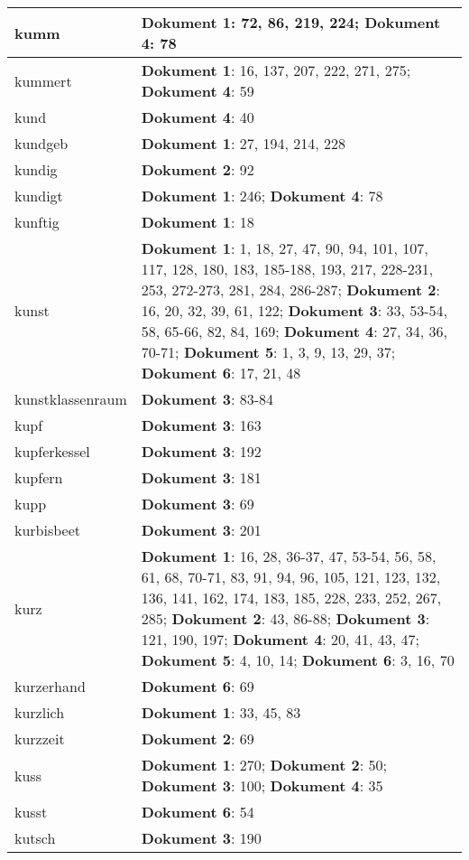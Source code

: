 \documentclass[a5paper]{article}
\begin{document}
\begin{longtable}[l]{|l|p{3in}|}
\hline
kumm & \textbf{Dokument 1}: 72, 86, 219, 224; \textbf{Dokument 4}: 78 \\
\hline
kummert & \textbf{Dokument 1}: 16, 137, 207, 222, 271, 275; \textbf{Dokument 4}: 59 \\
\hline
kund & \textbf{Dokument 4}: 40 \\
\hline
kundgeb & \textbf{Dokument 1}: 27, 194, 214, 228 \\
\hline
kundig & \textbf{Dokument 2}: 92 \\
\hline
kundigt & \textbf{Dokument 1}: 246; \textbf{Dokument 4}: 78 \\
\hline
kunftig & \textbf{Dokument 1}: 18 \\
\hline
kunst & \textbf{Dokument 1}: 1, 18, 27, 47, 90, 94, 101, 107, 117, 128, 180, 183, 185-188, 193, 217, 228-231, 253, 272-273, 281, 284, 286-287; \textbf{Dokument 2}: 16, 20, 32, 39, 61, 122; \textbf{Dokument 3}: 33, 53-54, 58, 65-66, 82, 84, 169; \textbf{Dokument 4}: 27, 34, 36, 70-71; \textbf{Dokument 5}: 1, 3, 9, 13, 29, 37; \textbf{Dokument 6}: 17, 21, 48 \\
\hline
kunstklassenraum & \textbf{Dokument 3}: 83-84 \\
\hline
kupf & \textbf{Dokument 3}: 163 \\
\hline
kupferkessel & \textbf{Dokument 3}: 192 \\
\hline
kupfern & \textbf{Dokument 3}: 181 \\
\hline
kupp & \textbf{Dokument 3}: 69 \\
\hline
kurbisbeet & \textbf{Dokument 3}: 201 \\
\hline
kurz & \textbf{Dokument 1}: 16, 28, 36-37, 47, 53-54, 56, 58, 61, 68, 70-71, 83, 91, 94, 96, 105, 121, 123, 132, 136, 141, 162, 174, 183, 185, 228, 233, 252, 267, 285; \textbf{Dokument 2}: 43, 86-88; \textbf{Dokument 3}: 121, 190, 197; \textbf{Dokument 4}: 20, 41, 43, 47; \textbf{Dokument 5}: 4, 10, 14; \textbf{Dokument 6}: 3, 16, 70 \\
\hline
kurzerhand & \textbf{Dokument 6}: 69 \\
\hline
kurzlich & \textbf{Dokument 1}: 33, 45, 83 \\
\hline
kurzzeit & \textbf{Dokument 2}: 69 \\
\hline
kuss & \textbf{Dokument 1}: 270; \textbf{Dokument 2}: 50; \textbf{Dokument 3}: 100; \textbf{Dokument 4}: 35 \\
\hline
kusst & \textbf{Dokument 6}: 54 \\
\hline
kutsch & \textbf{Dokument 3}: 190 \\

\end{longtable}
\end{document}
